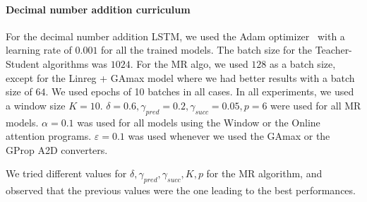 \documentclass{article}
\begin{document}
\paragraph{Decimal number addition curriculum} 
For the decimal number addition LSTM, we used the Adam optimizer~\citep{kingma2014adam} with a learning rate of $0.001$ for all the trained models. The batch size for the Teacher-Student algorithms was $1024$. For the MR algo, we used $128$ as a batch size, except for the Linreg + GAmax model where we had better results with a batch size of $64$. We used epochs of 10 batches in all cases. In all experiments, we used a window size $K=10$. $\delta=0.6, \gamma_{pred}=0.2, \gamma_{succ}=0.05, p=6$ were used for all MR models. $\alpha = 0.1$ was used for all models using the Window or the Online attention programs. $\varepsilon=0.1$ was used whenever we used the GAmax or the GProp A2D converters.

We tried different values for $\delta, \gamma_{pred}, \gamma_{succ}, K, p$ for the MR algorithm, and observed that the previous values were the one leading to the best performances.
\end{document}
